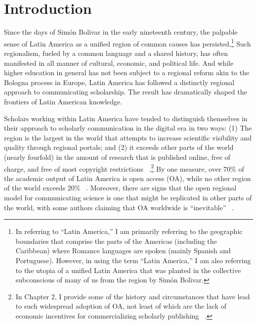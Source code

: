 \def\mytitle{The Public Impact of Latin America's Approach to Open Access}
\def\myauthor{Juan Pablo Alperin}


\chapter{Introduction}
\label{introduction}

Since the days of Simón Bolivar in the early nineteenth century, the palpable sense of Latin America as a unified region of common causes has persisted.\footnote{In referring to ``Latin America,'' I am primarily referring to the geographic boundaries that comprise the parts of the Americas (including the Caribbean) where Romance languages are spoken (mainly Spanish and Portuguese). However, in using the term ``Latin America,'' I am also referring to the utopia of a unified Latin America that was planted in the collective subconscious of many of us from the region by Simón Bolivar.} Such regionalism, fueled by a common language and a shared history, has often manifested in all manner of cultural, economic, and political life. And while higher education in general has not been subject to a regional reform akin to the Bologna process in Europe, Latin America has followed a distinctly regional approach to communicating scholarship. The result has dramatically shaped the frontiers of Latin American knowledge.

Scholars working within Latin America have tended to distinguish themselves in their approach to scholarly communication in the digital era in two ways: (1) The region is the largest in the world that attempts to increase scientific visibility and quality through regional portals; and (2) it exceeds other parts of the world (nearly fourfold) in the amount of research that is published online, free of charge, and free of most copyright restrictions ~\citep{Alperin2008,Haider:2005kx,Miguel2011}.\footnote{In Chapter 2, I provide some of the history and circumstances that have lead to such widespread adoption of OA, not least of which are the lack of economic incentives for commercializing scholarly publishing ~\citep{Estrada-Mejia2010,Holdom2005,Packer2007}.} By one measure, over 70\% of the academic output of Latin America is open access (OA), while no other region of the world exceeds 20\% ~\citep{Miguel2011}. Moreover, there are signs that the open regional model for communicating science is one that might be replicated in other parts of the world, with some authors claiming that OA worldwide is ``inevitable'' ~\citep{Lewis2012}.

